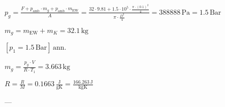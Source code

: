 \( p_g = \frac{F + p_{\text{amb}} \cdot m_g + p_{\text{amb}} \cdot m_{\text{EW}}}{A} = \frac{32 \cdot 9.81 + 1.5 \cdot 10^5 \cdot \frac{\pi \cdot (0.1)^2}{4}}{\pi \cdot \frac{D^2}{4}} = 388888 \, \text{Pa} = 1.5 \, \text{Bar} \)  

\( m_g = m_{\text{EW}} + m_K = 32.1 \, \text{kg} \)  

\( [p_1 = 1.5 \, \text{Bar}] \, \text{ann.} \)  

\( m_g = \frac{p_g \cdot V}{R \cdot T_1} = 3.663 \, \text{kg} \)  

\( R = \frac{R}{M} = 0.1663 \, \frac{\text{J}}{\text{gK}} = \frac{166.263 \, \text{J}}{\text{kgK}} \)  

---